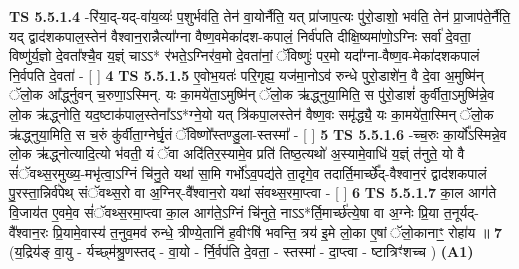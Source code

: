 \documentclass[17pt]{extarticle}
\begin{document}
                  \newline
                                \textbf{ TS 5.5.1.4} \newline
                  -रि॑या॒द्-यद्-वा॑य॒व्यः॑ प॒शुर्भव॑ति॒ तेन॑ वा॒योर्नैति॒ यत् प्रा॑जाप॒त्यः पु॑रो॒डाशो॒ भव॑ति॒ तेन॑ प्रा॒जाप॑ते॒र्नैति॒ यद् द्वाद॑शकपाल॒स्तेन॑ वैश्वान॒रान्नैत्या᳚ग्ना वैष्ण॒वमेका॑दश-कपालं॒ निर्व॑पति दीक्षि॒ष्यमा॑णो॒ऽग्निः सर्वा॑ दे॒वता॒ विष्णु॑र्य॒ज्ञो दे॒वता᳚श्चै॒व य॒ज्ञ्ं चाऽऽ* र॑भते॒ऽग्निर॑व॒मो दे॒वता॑नां॒ ॅविष्णुः॑ पर॒मो यदा᳚ग्ना-वैष्ण॒व-मेका॑दशकपालं नि॒र्वपति दे॒वता॑ - [  ] \textbf{  4} \newline
                  \newline
                                \textbf{ TS 5.5.1.5} \newline
                  ए॒वोभ॒यतः॑ परि॒गृह्य॒ यज॑मा॒नोऽव॑ रुन्धे पुरो॒डाशे॑न॒ वै दे॒वा अ॒मुष्मि॑न् ॅलो॒क आ᳚र्द्ध्नुवन् च॒रुणा॒ऽस्मिन्. यः का॒मये॑ता॒ऽमुष्मि॑न् ॅलो॒क ऋ॑द्ध्नुया॒मिति॒ स पु॑रो॒डाशं॑ कुर्वीता॒ऽमुष्मि॑न्ने॒व लो॒क ऋ॑द्ध्नोति॒ यद॒ष्टाक॑पाल॒स्तेना᳚ऽऽ*ग्ने॒यो यत् त्रि॑कपा॒लस्तेन॑ वैष्ण॒वः समृ॑द्ध्यै॒ यः का॒मये॑ता॒स्मिन् ॅलो॒क ऋ॑द्ध्नुया॒मिति॒ स च॒रुं कु॑र्वीता॒ग्नेर्घृ॒तं ॅविष्णो᳚स्तण्डु॒ला-स्तस्मा᳚ - [  ] \textbf{  5} \newline
                  \newline
                                \textbf{ TS 5.5.1.6} \newline
                  -च्च॒रुः का॒र्यो᳚ऽस्मिन्ने॒व लो॒क ऋ॑द्ध्नोत्यादि॒त्यो भ॑वती॒ यं ॅवा अदि॑तिर॒स्यामे॒व प्रति॑ तिष्ठ॒त्यथो॑ अ॒स्यामे॒वाधि॑ य॒ज्ञ्ं त॑नुते॒ यो वै सं॑ॅवथ्स॒रमुख्य॒-मभृ॑त्वा॒ऽग्निं चि॑नु॒ते यथा॑ सा॒मि गर्भो॑ऽव॒पद्य॑ते ता॒दृगे॒व तदार्ति॒मार्च्छे᳚द्-वैश्वान॒रं द्वाद॑शकपालं पु॒रस्ता॒न्निर्व॑पेथ् संॅवथ्स॒रो वा अ॒ग्निर्-वै᳚श्वान॒रो यथा॑ संवथ्स॒रमा॒प्त्वा - [  ] \textbf{  6} \newline
                  \newline
                                \textbf{ TS 5.5.1.7} \newline
                  का॒ल आग॑ते वि॒जाय॑त ए॒वमे॒व सं॑ॅवथ्स॒रमा॒प्त्वा का॒ल आग॑ते॒ऽग्निं चि॑नुते॒ नाऽऽ*र्ति॒मार्च्छ॑त्ये॒षा वा अ॒ग्नेः प्रि॒या त॒नूर्यद्-वै᳚श्वान॒रः प्रि॒यामे॒वास्य॑ त॒नुव॒मव॑ रुन्धे॒ त्रीण्ये॒तानि॑ ह॒वीꣳषि॑ भवन्ति॒ त्रय॑ इ॒मे लो॒का ए॒षां ॅलो॒कानाꣳ॒॒ रोहा॑य ॥ \textbf{  7 } \newline
                  \newline
                      (य॒द्रिय॑ङ् वा॒यु - र्यच्छ्म॑श्रु॒णस्तद् - वा॒यो - र्नि॒र्वप॑ति दे॒वता॒ - स्तस्मा॑ - दा॒प्त्वा - ष्टात्रिꣳ॑शच्च )  \textbf{(A1)} \newline \newline
\end{document}
